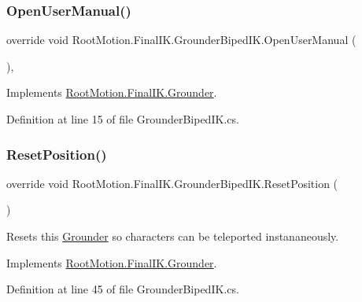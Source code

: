 \subsubsection{\texorpdfstring{Open\+User\+Manual()}{OpenUserManual()}}
{\footnotesize\ttfamily override void Root\+Motion.\+Final\+I\+K.\+Grounder\+Biped\+I\+K.\+Open\+User\+Manual (\begin{DoxyParamCaption}{ }\end{DoxyParamCaption})\hspace{0.3cm}{\ttfamily [protected]}, {\ttfamily [virtual]}}



Implements \mbox{\hyperlink{class_root_motion_1_1_final_i_k_1_1_grounder_af214d235ecea1b81ec637b1b61f756cb}{Root\+Motion.\+Final\+I\+K.\+Grounder}}.



Definition at line 15 of file Grounder\+Biped\+I\+K.\+cs.

\mbox{\label{class_root_motion_1_1_final_i_k_1_1_grounder_biped_i_k_ac1056a274304d351106919897e21f57c}} 
\subsubsection{\texorpdfstring{Reset\+Position()}{ResetPosition()}}
{\footnotesize\ttfamily override void Root\+Motion.\+Final\+I\+K.\+Grounder\+Biped\+I\+K.\+Reset\+Position (\begin{DoxyParamCaption}{ }\end{DoxyParamCaption})\hspace{0.3cm}{\ttfamily [virtual]}}



Resets this \mbox{\hyperlink{class_root_motion_1_1_final_i_k_1_1_grounder}{Grounder}} so characters can be teleported instananeously. 



Implements \mbox{\hyperlink{class_root_motion_1_1_final_i_k_1_1_grounder_aecbd8b5addf2948f4d5fcd00a1b03314}{Root\+Motion.\+Final\+I\+K.\+Grounder}}.



Definition at line 45 of file Grounder\+Biped\+I\+K.\+cs.



